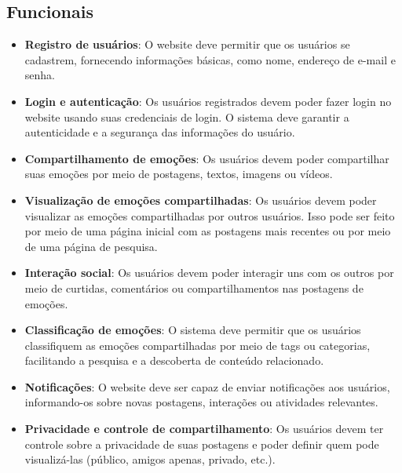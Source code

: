 \documentclass[12pt]{article}
\begin{document}
\subsection{Funcionais}
\begin{itemize}
  \item \textbf{Registro de usuários}: O website deve permitir que os usuários se cadastrem, fornecendo informações básicas, como nome, endereço de e-mail e senha.
  \item \textbf{Login e autenticação}: Os usuários registrados devem poder fazer login no website usando suas credenciais de login. O sistema deve garantir a autenticidade e a segurança das informações do usuário.
  \item \textbf{Compartilhamento de emoções}: Os usuários devem poder compartilhar suas emoções por meio de postagens, textos, imagens ou vídeos.
  \item \textbf{Visualização de emoções compartilhadas}: Os usuários devem poder visualizar as emoções compartilhadas por outros usuários. Isso pode ser feito por meio de uma página inicial com as postagens mais recentes ou por meio de uma página de pesquisa.
  \item \textbf{Interação social}: Os usuários devem poder interagir uns com os outros por meio de curtidas, comentários ou compartilhamentos nas postagens de emoções.
  \item \textbf{Classificação de emoções}: O sistema deve permitir que os usuários classifiquem as emoções compartilhadas por meio de tags ou categorias, facilitando a pesquisa e a descoberta de conteúdo relacionado.
  \item \textbf{Notificações}: O website deve ser capaz de enviar notificações aos usuários, informando-os sobre novas postagens, interações ou atividades relevantes.
  \item \textbf{Privacidade e controle de compartilhamento}: Os usuários devem ter controle sobre a privacidade de suas postagens e poder definir quem pode visualizá-las (público, amigos apenas, privado, etc.).
\end{itemize}
\end{document}
